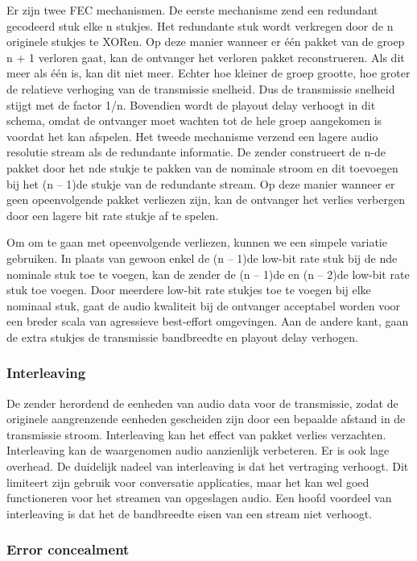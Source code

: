 \noindent Er zijn twee FEC mechanismen. De eerste mechanisme zend een redundant gecodeerd stuk elke n stukjes. Het redundante stuk wordt verkregen door de n originele stukjes te XORen. Op deze manier wanneer er één pakket van de groep n + 1 verloren gaat, kan de ontvanger het verloren pakket reconstrueren. Als dit meer als één is, kan dit niet meer. Echter hoe kleiner de groep grootte, hoe groter de relatieve verhoging van de transmissie snelheid. Dus de transmissie snelheid stijgt met de factor 1/n. Bovendien wordt de playout delay verhoogt in dit schema, omdat de ontvanger moet wachten tot de hele groep aangekomen is voordat het kan afspelen.
Het tweede mechanisme verzend een lagere audio resolutie stream als de redundante informatie. De zender construeert de n-de pakket door het nde stukje te pakken van de nominale stroom en dit toevoegen bij het (n – 1)de stukje van de redundante stream. Op deze manier wanneer er geen opeenvolgende pakket verliezen zijn, kan de ontvanger het verlies verbergen door een lagere bit rate stukje af te spelen.

\noindent Om om te gaan met opeenvolgende verliezen, kunnen we een simpele variatie gebruiken. In plaats van gewoon enkel de (n – 1)de low-bit rate stuk bij de nde nominale stuk toe te voegen, kan de zender de (n – 1)de en (n – 2)de low-bit rate stuk toe voegen. Door meerdere low-bit rate stukjes toe te voegen bij elke nominaal stuk, gaat de audio kwaliteit bij de ontvanger acceptabel worden voor een breder scala van agressieve best-effort omgevingen. Aan de andere kant, gaan de extra stukjes de transmissie bandbreedte en playout delay verhogen.

\subsubsection{Interleaving}

De zender herordend de eenheden van audio data voor de transmissie, zodat de originele aangrenzende eenheden gescheiden zijn door een bepaalde afstand in de transmissie stroom. Interleaving kan het effect van pakket verlies verzachten. Interleaving kan de waargenomen audio aanzienlijk verbeteren. Er is ook lage overhead. De duidelijk nadeel van interleaving is dat het vertraging verhoogt. Dit limiteert zijn gebruik voor conversatie applicaties, maar het kan wel goed functioneren voor het streamen van opgeslagen audio. Een hoofd voordeel van interleaving is dat het de bandbreedte eisen van een stream niet verhoogt.

\subsubsection{Error concealment}

